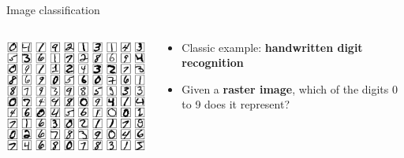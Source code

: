 \begin{frame}{Image classification}
	\begin{columns}
		\begin{column}{0.48\textwidth}
			\includegraphics[width=\textwidth]{mnist_100_digits}
		\end{column}
		\begin{column}{0.48\textwidth}
			\begin{itemize}
				\pause\item Classic example: \textbf{handwritten digit recognition}
				\pause\item Given a \textbf{raster image}, which of the digits 0 to 9 does it represent?
			\end{itemize}
		\end{column}
	\end{columns}
\end{frame}

